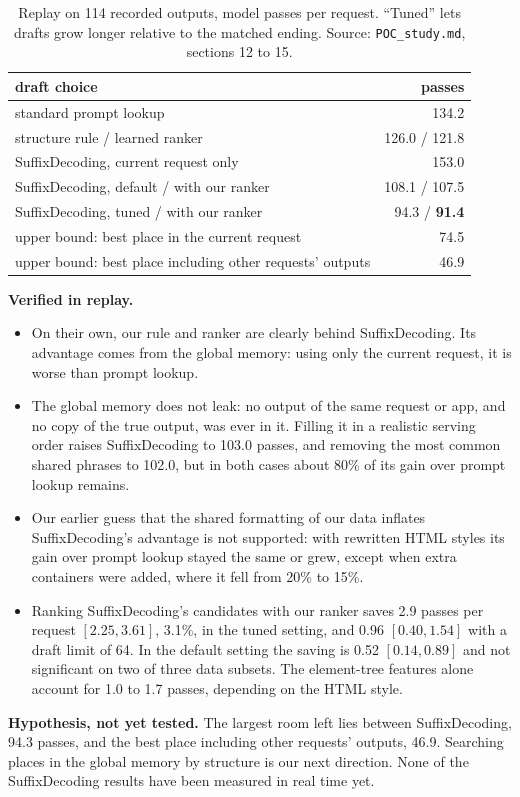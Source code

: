 \documentclass[10pt,a4paper]{article}
\begin{document}
\begin{table}[H]\centering\small
\caption{Replay on 114 recorded outputs, model passes per request. ``Tuned'' lets drafts grow longer relative to the matched ending. Source: \texttt{POC\_study.md}, sections 12 to 15.}\label{tab:sd}
\begin{tabular}{lr}
\toprule
draft choice & passes\\
\midrule
standard prompt lookup & 134.2\\
structure rule / learned ranker & 126.0 / 121.8\\
SuffixDecoding, current request only & 153.0\\
SuffixDecoding, default / with our ranker & 108.1 / 107.5\\
SuffixDecoding, tuned / with our ranker & 94.3 / \textbf{91.4}\\
upper bound: best place in the current request & 74.5\\
upper bound: best place including other requests' outputs & 46.9\\
\bottomrule
\end{tabular}
\end{table}
\textbf{Verified in replay.}
\begin{itemize}[itemsep=1pt]
\item On their own, our rule and ranker are clearly behind SuffixDecoding. Its advantage comes from the global memory: using only the current request, it is worse than prompt lookup.
\item The global memory does not leak: no output of the same request or app, and no copy of the true output, was ever in it. Filling it in a realistic serving order raises SuffixDecoding to 103.0 passes, and removing the most common shared phrases to 102.0, but in both cases about 80\% of its gain over prompt lookup remains.
\item Our earlier guess that the shared formatting of our data inflates SuffixDecoding's advantage is not supported: with rewritten HTML styles its gain over prompt lookup stayed the same or grew, except when extra containers were added, where it fell from 20\% to 15\%.
\item Ranking SuffixDecoding's candidates with our ranker saves 2.9 passes per request $[2.25, 3.61]$, 3.1\%, in the tuned setting, and 0.96 $[0.40, 1.54]$ with a draft limit of 64. In the default setting the saving is 0.52 $[0.14, 0.89]$ and not significant on two of three data subsets. The element-tree features alone account for 1.0 to 1.7 passes, depending on the HTML style.
\end{itemize}
\textbf{Hypothesis, not yet tested.} The largest room left lies between SuffixDecoding, 94.3 passes, and the best place including other requests' outputs, 46.9. Searching places in the global memory by structure is our next direction. None of the SuffixDecoding results have been measured in real time yet.
\end{document}
